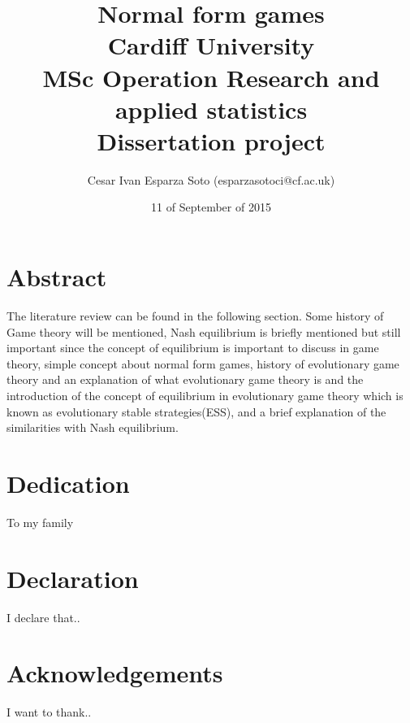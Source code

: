 \documentclass[12pt]{book}
\begin{document}
\thispagestyle{empty}
\title{
{Normal form games}\\
{Cardiff University}\\
{MSc Operation Research and applied statistics}\\
{Dissertation project}\\
}

\author{Cesar Ivan Esparza Soto (esparzasotoci@cf.ac.uk)}
\date{11 of September of 2015}
\maketitle

\thispagestyle{empty}
\chapter*{Abstract}
The literature review can be found in the following section. Some history of Game theory will be mentioned, Nash equilibrium is briefly mentioned but still important since the concept of equilibrium is important to discuss in game theory, simple concept about normal form games, history of evolutionary game theory and an explanation of what evolutionary game theory is and the introduction of the concept of equilibrium in evolutionary game theory which is known as evolutionary stable strategies(ESS), and a brief explanation of the similarities with Nash equilibrium.

\thispagestyle{empty}
\chapter*{Dedication}
To my family
\thispagestyle{empty}
\chapter*{Declaration}
I declare that..
\thispagestyle{empty}
\chapter*{Acknowledgements}
I want to thank..

\newpage
\thispagestyle{empty}
\tableofcontents

\newpage
\thispagestyle{empty}
\listoftables

\newpage
\thispagestyle{empty}
\listoffigures

\newpage
\maketitle
 
\end{document}
